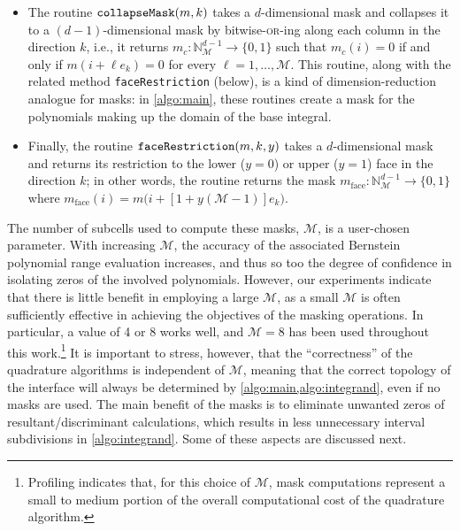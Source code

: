 \documentclass[onefignum,onetabnum,onealgnum,oneeqnum]{siamart190516}
\begin{document}
\begin{itemize}
%
\item The routine $\verb|collapseMask|(m, k)$
takes a $d$-dimensional mask and collapses it to a $(d-1)$-dimensional mask by bitwise-\textsc{or}-ing along each column in the direction $k$, i.e., it returns $m_c : {\mathbb N}_{\mathcal M}^{d-1} \to \{0,1\}$ such that $m_c(i) = 0$ if and only if $m(i + \ell e_k) = 0$ for every $\ell = 1,\ldots,\mathcal M$. This routine, along with the related method \verb|faceRestriction| (below), is a kind of dimension-reduction analogue for masks: in \cref{algo:main}, these routines create a mask for the polynomials making up the domain of the base integral. 
\item Finally, the routine $\verb|faceRestriction|(m, k, y)$
takes a $d$-dimensional mask and returns its restriction to the lower ($y = 0$) or upper ($y = 1$) face in the direction $k$; in other words, the routine returns the mask $m_\text{face} : {\mathbb N}_{\mathcal M}^{d-1} \to \{0,1\}$ where $m_\text{face}(i) = m\bigl(i + [1 + y ({\mathcal M} - 1)] e_k \bigr)$.
\end{itemize}



The number of subcells used to compute these masks, $\mathcal M$, is a user-chosen parameter. With increasing $\mathcal M$, the accuracy of the associated Bernstein polynomial range evaluation increases, and thus so too the degree of confidence in isolating zeros of the involved polynomials. However, our experiments indicate that there is little benefit in employing a large $\mathcal M$, as a small $\mathcal M$ is often sufficiently effective in achieving the objectives of the masking operations. In particular, a value of 4 or 8 works well, and $\mathcal M = 8$ has been used throughout this work.\footnote{Profiling indicates that, for this choice of $\mathcal M$, mask computations represent a small to medium portion of the overall computational cost of the quadrature algorithm.} It is important to stress, however, that the ``correctness'' of the quadrature algorithms is independent of $\mathcal M$, meaning that the correct topology of the interface will always be determined by \cref{algo:main,algo:integrand}, even if no masks are used. The main benefit of the masks is to eliminate unwanted zeros of resultant/discriminant calculations, which results in less unnecessary interval subdivisions in \cref{algo:integrand}. Some of these aspects are discussed next.
\end{document}
